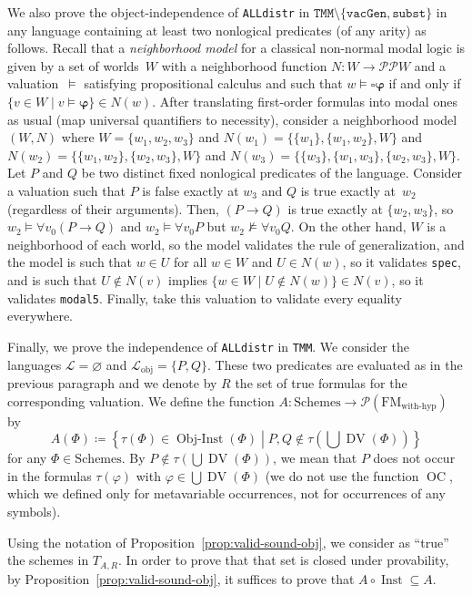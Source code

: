 \documentclass[11pt]{article}
\renewcommand*{\phi}{\varphi}
\newcommand*{\calL}{\mathcal{L}}
\newcommand*{\calP}{\mathcal{P}}
\newcommand*{\FM}{\mathrm{FM}}
\DeclareMathOperator{\DV}{DV}
\DeclareMathOperator{\OC}{OC}
\newcommand*{\Schemes}{\mathrm{Schemes}}
\newcommand*{\FMwithhyp}{{\FM_{\mathrm{with}\text{-}\mathrm{hyp}}}}
\DeclareMathOperator{\Inst}{Inst}
\theoremstyle{plain}
\theoremstyle{definition}
\theoremstyle{remark}
\begin{document}
We also prove the object-independence of \texttt{ALLdistr} in
$\texttt{TMM} \setminus \{ \texttt{vacGen}, \texttt{subst} \}$ in any language containing at least
two nonlogical predicates (of any arity) as follows.
Recall that a \emph{neighborhood model} for a classical non-normal modal logic is given by a set
of worlds~$W$ with a neighborhood function $N \colon W \to \calP \calP W$ and a valuation~$\vDash$
satisfying propositional calculus and such that $w \vDash \square \bm\phi$ if and only if
$\{ v \in W \mid v \vDash \bm\phi \} \in N(w)$.
After translating first-order formulas into modal ones as usual (map universal quantifiers to
necessity), consider a neighborhood model $(W, N)$ where
$W = \{ w_1, w_2, w_3 \}$ and
$N(w_1) = \{ \{w_1\}, \{ w_1, w_2 \}, W \}$ and
$N(w_2) = \{ \{w_1, w_2\}, \{ w_2, w_3 \}, W \}$ and
$N(w_3) = \{ \{w_3\}, \{ w_1, w_3 \}, \{ w_2, w_3 \}, W \}$.
Let $P$ and $Q$ be two distinct fixed nonlogical predicates of the language.
Consider a valuation such that $P$ is false exactly at $w_3$ and $Q$ is true exactly at~$w_2$
(regardless of their arguments).
Then, $(P \to Q)$ is true exactly at $\{ w_2, w_3 \}$, so
$w_2 \vDash \forall v_0 (P \to Q)$ and
$w_2 \vDash \forall v_0 P$ but
$w_2 \not\vDash \forall v_0 Q$.
On the other hand, $W$ is a neighborhood of each world, so the model validates the rule of
generalization, and the model is such that $w \in U$ for all $w \in W$ and $U \in N(w)$, so
it validates \texttt{spec}, and is such that $U \notin N(v)$ implies
$\{ w \in W \mid U \notin N(w) \} \in N(v)$, so it validates \texttt{modal5}.
Finally, take this valuation to validate every equality everywhere.


Finally, we prove the independence of \texttt{ALLdistr} in \texttt{TMM}.
We consider the languages $\calL = \varnothing$ and $\calL_\text{obj} = \{P, Q \}$.
These two predicates are evaluated as in the previous paragraph and we denote by $R$
the set of true formulas for the corresponding valuation.
We define the function $A \colon \Schemes \to \calP(\FMwithhyp)$ by
\[
A(\Phi) \coloneqq \left\{ \tau(\Phi) \in \operatorname{Obj-Inst}(\Phi) \middle|
P, Q \notin \tau(\bigcup \DV(\Phi))
\right\}
\]
for any $\Phi \in \Schemes$.
By $P \notin \tau(\bigcup \DV(\Phi))$, we mean that $P$ does not occur in the formulas $\tau(\phi)$
with $\phi \in \bigcup \DV(\Phi)$ (we do not use the function $\OC$, which we defined only for
metavariable occurrences, not for occurrences of any symbols).

Using the notation of Proposition~\ref{prop:valid-sound-obj}, we consider as ``true'' the schemes
in $T_{A, R}$.
In order to prove that that set is closed under provability, by Proposition~\ref{prop:valid-sound-obj},
it suffices to prove that $A \circ \Inst \subseteq A$.
\end{document}
